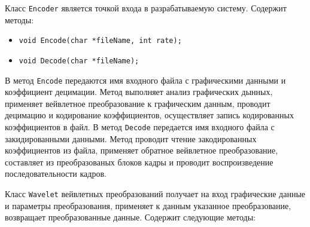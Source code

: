 Класс \texttt{Encoder} является точкой входа в разрабатываемую систему. 
Содержит методы:
\begin{itemize}
 \item \texttt{void Encode(char *fileName, int rate);}
 \item \texttt{void Decode(char *fileName);}
\end{itemize}
 
В метод \texttt{Encode} передаются имя входного файла 
с графическими данными
и коэффициент децимации. Метод выполняет анализ графических дынных, применяет вейвлетное преобразование к графическим данным, 
проводит децимацию и кодирование коэффициентов, осуществляет запись кодированных коэффициентов в файл.
В метод \texttt{Decode} передается имя входного файла с закидированными данными. Метод проводит чтение закодированных коэффициентов 
из файла, применяет обратное вейвлетное преобразование, составляет из преобразованых блоков кадры и проводит воспроизведение последовательности кадров.

Класс \texttt{Wavelet} вейвлетных преобразований получает на вход графические данные и параметры преобразования, 
применяет к данным указанное преобразование, возвращает преобразованные данные. Содержит следующие методы:

